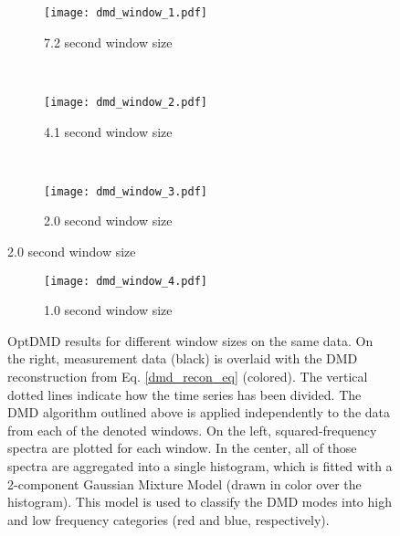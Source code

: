 \documentclass[11pt]{article} %
\begin{document}

\begin{figure}
\centering
\begin{subfigure}[b]{\textwidth}
	\texttt{[image: dmd\_window\_1.pdf]}
	\caption{7.2 second window size}
\end{subfigure}\\[.3 in]
\begin{subfigure}[b]{\textwidth}
	\texttt{[image: dmd\_window\_2.pdf]}
	\caption{4.1 second window size}
\end{subfigure}\\[.3 in]
\begin{subfigure}[b]{\textwidth}
	\texttt{[image: dmd\_window\_3.pdf]}
	\caption{2.0 second window size}
\end{subfigure}
\end{figure}
\begin{figure}\ContinuedFloat
\centering
\begin{subfigure}[b]{\textwidth}
	\texttt{[image: dmd\_window\_4.pdf]}
	\caption{1.0 second window size}
\end{subfigure}
\caption{OptDMD results for different window sizes on the same data. On the right, measurement data (black) is overlaid with the DMD reconstruction from Eq. \ref{dmd_recon_eq} (colored). The vertical dotted lines indicate how the time series has been divided. The DMD algorithm outlined above is applied independently to the data from each of the denoted windows. On the left, squared-frequency spectra are plotted for each window. In the center, all of those spectra are aggregated into a single histogram, which is fitted with a 2-component Gaussian Mixture Model (drawn in color over the histogram). This model is used to classify the DMD modes into high and low frequency categories (red and blue, respectively).}
\label{fig:varied_window_size}
\end{figure}
\end{document}
